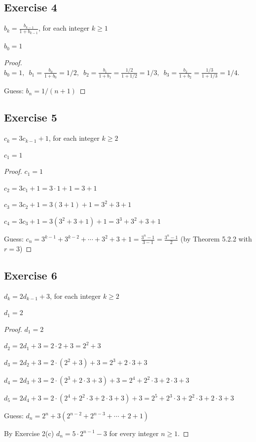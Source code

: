 \documentclass[14pt]{extarticle}
\newcommand{\dps}{\displaystyle}
\newcommand{\cy}{\color{cyan}}
\begin{document}
\subsection{Exercise 4}
\(b_k = \dps \frac{b_{k-1}}{1 + b_{k-1}}\), for each integer \(k \geq 1\)

\(b_0 = 1\)

\begin{proof}
\(b_0 = 1, \,\,\, b_1 = \dps \frac{b_0}{1 + b_0} = 1/2, \,\,\, b_2 = \dps \frac{b_1}{1 + b_1} = \frac{1/2}{1+1/2}
= 1/3, \,\,\, b_3 = \dps \frac{b_2}{1 + b_2} = \frac{1/3}{1+1/3} = 1/4.\)

Guess: \(b_n = 1/(n+1)\)
\end{proof}

\subsection{Exercise 5}
\(c_k = 3c_{k-1} + 1\), for each integer \(k \geq 2\)

\(c_1 = 1\)

\begin{proof}
\(c_1 = 1\)

\(c_2 = 3c_1 + 1 = 3 \cdot 1 + 1 = 3 + 1\)

\(c_3 = 3c_2 + 1 = 3(3 + 1) + 1 = 3^2 + 3 + 1\)

\(c_4 = 3c_3 + 1 = 3(3^2 + 3 + 1) + 1 = 3^3 + 3^2 + 3 + 1\)

Guess: \(c_n = 3^{k-1} + 3^{k-2} + \cdots + 3^2 + 3 + 1 = \dps \frac{3^n - 1}{3 - 1} = \frac{3^n - 1}{2}\) 
{\cy (by Theorem 5.2.2 with $r = 3$)}
\end{proof}

\subsection{Exercise 6}
\(d_k = 2d_{k-1} + 3\), for each integer \(k \geq 2\)

\(d_1 = 2\)

\begin{proof}
\(d_1 = 2\)

\(d_2 = 2d_1 + 3 = 2 \cdot 2 + 3 = 2^2 + 3\)

\(d_3 = 2d_2 + 3 = 2 \cdot (2^2 + 3) + 3 = 2^3 + 2 \cdot 3 + 3\)

\(d_4 = 2d_3 + 3 = 2 \cdot (2^3 + 2 \cdot 3 + 3) + 3 = 2^4 + 2^2 \cdot 3 + 2 \cdot 3 + 3\)

\(d_5 = 2d_4 + 3 = 2 \cdot (2^4 + 2^2 \cdot 3 + 2 \cdot 3 + 3) + 3 = 2^5 + 2^3 \cdot 3 + 2^2 \cdot 3 + 2 \cdot 3 + 3\)

Guess: \(d_n = 2^n + 3(2^{n-2} + 2^{n-3} + \cdots + 2 + 1)\)

By Exercise 2(c) \(d_n = 5 \cdot 2^{n-1} - 3\) for every integer \(n \geq 1\).
\end{proof}
\end{document}
